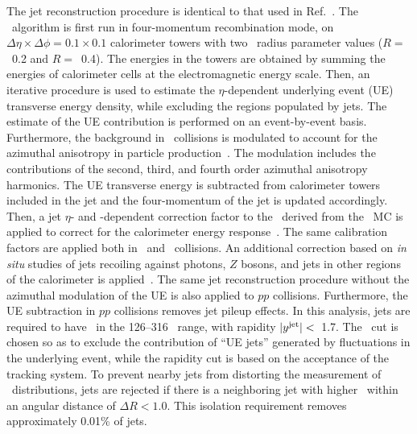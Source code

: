 
The jet reconstruction procedure is identical to that used in Ref.~\cite{2019108}.
The \antikt\ algorithm \cite{Cacciari:2008qp, Fastjet} is first run in four-momentum recombination mode, on $\Delta \eta \times \Delta \phi = 0.1\times 0.1$  calorimeter towers with two \antikt\ radius parameter values ($R=$~0.2 and $R=$~0.4).
The energies in the towers are obtained by summing the energies of calorimeter cells at the electromagnetic energy scale.
Then, an iterative procedure is used to estimate the $\eta$-dependent underlying event (UE)  transverse energy density, while excluding the regions populated by jets.
The estimate of the UE contribution is performed on an event-by-event basis.
Furthermore, the background in \pbpb\ collisions is modulated to account for the azimuthal anisotropy in particle production~\cite{ATLAS:2012at}.
The modulation includes the contributions of the second, third, and fourth order azimuthal anisotropy harmonics.
The UE transverse energy is subtracted from calorimeter towers included in the jet and the four-momentum of the jet is updated accordingly.
Then, a jet $\eta$- and \pT-dependent  correction factor to the \ptjet\ derived from the \pp\ MC is applied to correct for the calorimeter energy response~\cite{Aaboud:2017jcu}.
The same calibration factors are applied both in \pp\ and \pbpb\ collisions.
An additional correction based on \textit{in situ} studies of jets recoiling against photons, $Z$ bosons, and jets in other regions of the calorimeter is applied~\cite{ATL-PHYS-PUB-2015-036,2019167}.
The same jet reconstruction procedure without the azimuthal modulation of the UE is also applied to $pp$ collisions.
Furthermore, the UE subtraction in $pp$ collisions removes jet pileup effects.
In this analysis, jets are required to have \ptjet\ in the 126--316 \GeV\ range, with rapidity  $|\mbox{$y^{\mathrm{jet}}$}|<$~1.7.
The \ptjet\ cut is chosen so as to exclude the contribution of ``UE jets'' generated by fluctuations in the underlying event, while the rapidity cut is based on the acceptance of the tracking system.	  
To prevent nearby jets from distorting the measurement of \Dptr\ distributions, jets are rejected if there is a neighboring jet with higher \ptjet\ within an angular distance of $\Delta R < 1.0$.
This isolation requirement removes approximately 0.01\% of jets.

